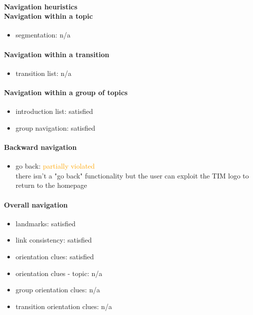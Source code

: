 \begin{enumerate}
	\paragraph*{Navigation heuristics \\ Navigation within a topic}
	\begin{itemize}
		\item segmentation: n/a
	\end{itemize}	
	
	\paragraph*{Navigation within a transition}
	\begin{itemize}
		\item transition list: n/a
	\end{itemize}
	
	\paragraph*{Navigation within a group of topics}
	\begin{itemize}
		\item introduction list: satisfied
		\item group navigation: satisfied
	\end{itemize}
	
	\paragraph*{Backward navigation}
	\begin{itemize}
		\item go back: \textcolor {orange}{partially violated}\\
		there isn't a "go back" functionality but the user can exploit the TIM logo to return to the homepage
	\end{itemize}
	
	\paragraph*{Overall navigation}
	\begin{itemize}
		\item landmarks: satisfied
		\item link consistency: satisfied
		\item orientation clues: satisfied
		\item orientation clues - topic: n/a
		\item group orientation clues: n/a
		\item transition orientation clues: n/a
	\end{itemize}	
	

\end{enumerate}
